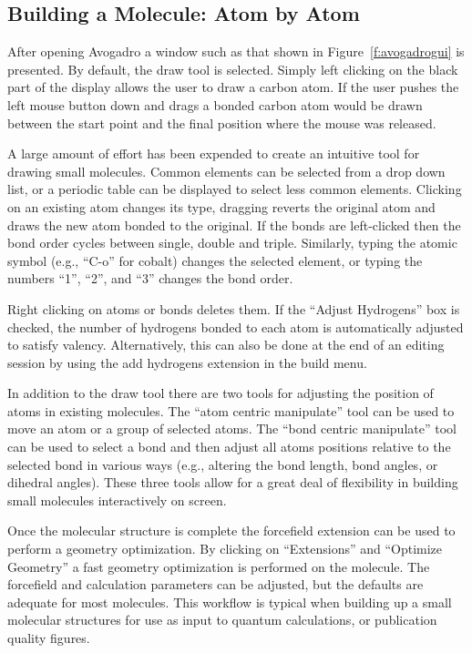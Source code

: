 \documentclass[10pt]{bmc_article}
\newenvironment{bmcformat}{\begin{raggedright}
\baselineskip20pt\sloppy\setboolean{publ}{false}}{\end{raggedright}
\baselineskip20pt\sloppy}
\begin{document}
\begin{bmcformat}
\subsection{Building a Molecule: Atom by Atom}

After opening Avogadro a window such as that shown in Figure~\ref{f:avogadrogui}
is presented. By default, the draw tool is selected. Simply left clicking on the
black part of the display
allows the user to draw a carbon atom. If the user pushes the left
mouse button down and drags a bonded carbon atom would be drawn
between the start point and the final position where the mouse was released.

A large amount of effort has been expended to create an intuitive tool for
drawing small molecules. Common elements can be selected from a drop down list,
or a periodic table can be displayed to select less common elements. Clicking on
an existing atom changes its type, dragging reverts the original atom and draws
the new atom bonded to the original. If the bonds are left-clicked then the bond
order cycles between single, double and triple. Similarly, typing the
atomic symbol (e.g., ``C-o'' for cobalt) changes the selected element,
or typing the numbers ``1'', ``2'', and ``3'' changes the bond order.

Right clicking on atoms or bonds deletes them. If the ``Adjust Hydrogens'' box
is checked, the number of hydrogens bonded to each atom is automatically
adjusted to satisfy valency. Alternatively, this can also be done at the end of
an editing session by using the add hydrogens extension in the build menu.

In addition to the draw tool there are two tools for adjusting the position of
atoms in existing molecules. The ``atom centric manipulate'' tool can be used to
move an atom or a group of selected atoms. The ``bond centric manipulate'' tool
can
be used to select a bond and then adjust all atoms positions relative to the
selected bond in various ways (e.g., altering the bond length, bond
angles, or dihedral angles). These three tools allow for a great deal of
flexibility in building small molecules interactively on screen.

Once the molecular structure is complete the forcefield extension can be used to
perform a geometry optimization. By clicking on ``Extensions'' and ``Optimize
Geometry'' a fast geometry optimization is performed on the molecule. The
forcefield and calculation parameters can be adjusted, but the defaults are
adequate for most molecules. This workflow is typical when building up a small
molecular structures for use as input to quantum calculations, or publication
quality figures.


\end{bmcformat}
\end{document}
